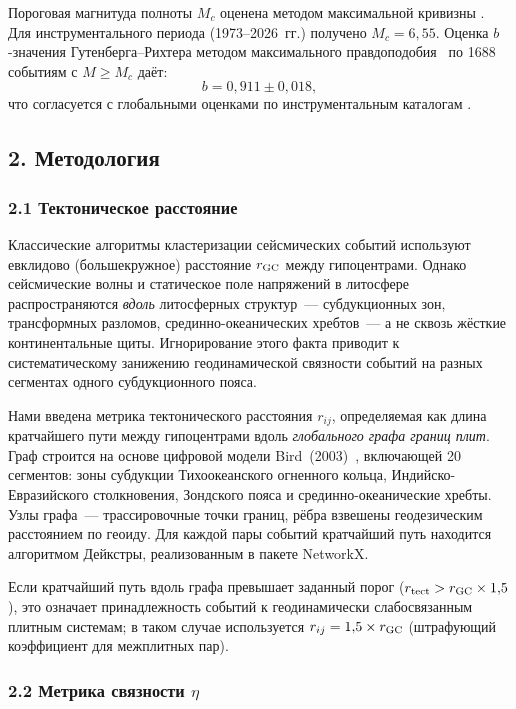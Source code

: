\documentclass[12pt,a4paper]{article}
\begin{document}
Пороговая магнитуда полноты $M_c$ оценена методом максимальной кривизны
\cite{Woessner2005}. Для инструментального периода (1973--2026~гг.) получено
$M_c=6{,}55$. Оценка $b$-значения Гутенберга--Рихтера методом максимального
правдоподобия~\cite{Aki1965,ShiBolt1982} по 1688 событиям с $M\geq M_c$ даёт:
\[
  b = 0{,}911 \pm 0{,}018,
\]
что согласуется с глобальными оценками по инструментальным каталогам
\cite{Frohlich2002,Bird2009}.

\vspace{0.3cm}

\subsection*{2. Методология}

\subsubsection*{2.1 Тектоническое расстояние}

Классические алгоритмы кластеризации сейсмических событий используют евклидово
(большекружное) расстояние $r_{\rm GC}$ между гипоцентрами. Однако сейсмические
волны и статическое поле напряжений в литосфере распространяются \textit{вдоль}
литосферных структур~--- субдукционных зон, трансформных разломов, срединно-океанических
хребтов~--- а не сквозь жёсткие континентальные щиты. Игнорирование этого факта
приводит к систематическому занижению геодинамической связности событий на
разных сегментах одного субдукционного пояса.

Нами введена метрика тектонического расстояния $r_{ij}$, определяемая как
длина кратчайшего пути между гипоцентрами вдоль \textit{глобального графа
границ плит}. Граф строится на основе цифровой модели Bird~(2003)~\cite{Bird2003},
включающей 20 сегментов: зоны субдукции Тихоокеанского огненного кольца,
Индийско-Евразийского столкновения, Зондского пояса и срединно-океанические хребты.
Узлы графа~--- трассировочные точки границ, рёбра взвешены геодезическим
расстоянием по геоиду. Для каждой пары событий кратчайший путь находится
алгоритмом Дейкстры, реализованным в пакете NetworkX.

Если кратчайший путь вдоль графа превышает заданный порог ($r_{\rm tect}>
r_{\rm GC}\times1{,}5$), это означает принадлежность событий к геодинамически
слабосвязанным плитным системам; в таком случае используется
$r_{ij}=1{,}5\times r_{\rm GC}$ (штрафующий коэффициент для межплитных пар).

\subsubsection*{2.2 Метрика связности $\eta$}
\end{document}
